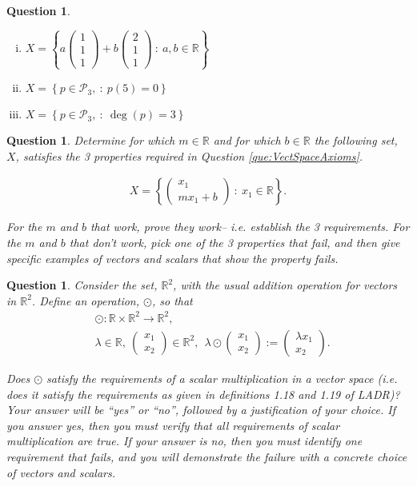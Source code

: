 \documentclass[12pt]{article}
\newtheorem{question}[thm]{Question}
\def\real{{\mathbb R}}
\def\lam{\lambda}
\def\P{\mathcal P}
\newcommand{\ColVecTwo}[2]{\begin{pmatrix} #1\\ #2\end{pmatrix}}
\newcommand{\ColVecThree}[3]{\begin{pmatrix} #1\\ #2\\ #3\end{pmatrix}}
\begin{document}
\begin{question}
\begin{enumerate}[(i)]
		\item $\displaystyle 
		X = \left\{  a\ColVecThree{1}{1}{1} + b\ColVecThree{2}{1}{1}\ :\ a,b\in\real   \right\}$
		
		\item $\displaystyle X = \left\{  p\in \P_3,\ :\ p(5)=0  \right \}$
		
		\item $\displaystyle X = \left\{  p\in \P_3,\ :\ \deg(p)=3  \right \}$
		
	\end{enumerate}
\end{question}



\vspace{0.4cm}





\begin{question}
	\normalfont
	
	
	Determine for which $m\in\real$ and for which $b\in\real$ the following set, $X$, satisfies the 3 properties required in Question \ref{que:VectSpaceAxioms}.
	
	\begin{align*}
		X = \left\{  \ColVecTwo{x_1}{mx_1+b}\ :\ x_1\in\real   \right\}.
	\end{align*}
	
	For the $m$ and $b$ that work, prove they work-- i.e. establish the 3 requirements.  For the $m$ and $b$ that don't work, pick one of the 3 properties that fail, and then give specific examples of vectors and scalars that show the property fails.
\end{question}
\vspace{0.4cm}


\begin{question}
	\normalfont
	
	Consider the set, $\real^2$, with the usual addition operation for vectors in $\real^2$. Define an operation, $\odot$, so that
	\begin{align*}
		&\odot: \real\times \real^2\to \real^2,\\
		&\lam\in\real,\ \ColVecTwo{x_1}{x_2}\in\real^2,\ \ 
		\lam\odot \ColVecTwo{x_1}{x_2}:= \ColVecTwo{\lam x_1}{x_2}.
	\end{align*}
	
	Does $\odot$ satisfy the requirements of a scalar multiplication in a vector space (i.e. does it satisfy the requirements as given in definitions 1.18 and 1.19 of LADR)?  Your answer will be ``yes'' or ``no'', followed by a justification of your choice.  If you answer yes, then you must verify that all requirements of scalar multiplication are true.  If your answer is no, then you must identify one requirement that fails, and you will demonstrate the failure with a concrete choice of vectors and scalars.
\end{question}
\end{document}
